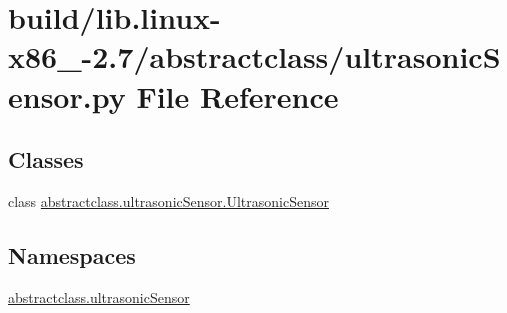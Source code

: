\hypertarget{build_2lib_8linux-x86__64-2_87_2abstractclass_2ultrasonicSensor_8py}{}\section{build/lib.linux-\/x86\+\_-\/2.7/abstractclass/ultrasonic\+Sensor.py File Reference}
\label{build_2lib_8linux-x86__64-2_87_2abstractclass_2ultrasonicSensor_8py}
\subsection*{Classes}
\begin{DoxyCompactItemize}
\item 
class \hyperlink{classabstractclass_1_1ultrasonicSensor_1_1UltrasonicSensor}{abstractclass.\+ultrasonic\+Sensor.\+Ultrasonic\+Sensor}
\end{DoxyCompactItemize}
\subsection*{Namespaces}
\begin{DoxyCompactItemize}
\item 
 \hyperlink{namespaceabstractclass_1_1ultrasonicSensor}{abstractclass.\+ultrasonic\+Sensor}
\end{DoxyCompactItemize}
